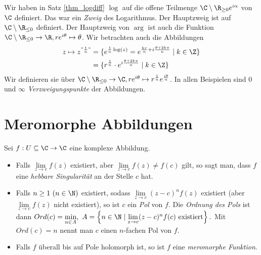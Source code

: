 		\begin{rem*}
			Wir haben in Satz \ref{thm_logdiff} $\log$ auf die offene Teilmenge $ \C \setminus \R_{\geq 0} e^{i\alpha} $ von $\C$ definiert. Das war ein \emph{Zweig} des Logarithmus. Der Hauptzweig ist auf $\C \setminus \R_{\leq 0}$ definiert. Der Hauptzweig von $\arg$ ist auch die Funktion $ \C \setminus \R_{\leq 0} \to \R, re^{i\theta} \mapsto \theta $. Wir betrachten auch die Abbildungen
			\begin{align*}
				z \mapsto z^{"\frac{1}{n}"} &= \{ e^{\frac{1}{n}\log(z)} = e^{\frac{hr}{n} + i \frac{\theta + 2k\pi}{n}} \mid k \in \Z \}\\
				&= \{ r^\frac{1}{n} \cdot e^{i \frac{\theta + 2k\pi}{n}} \mid k \in \Z \}
			\end{align*}
			Wir definieren sie über $ \C \setminus \R_{\leq 0} \to \C, re^{i\theta} \mapsto r^\frac{1}{n} e^\frac{i\theta}{n} $. In allen Beispielen sind 0 und $\infty$ \emph{Verzweigungspunkte} der Abbildungen.
		\end{rem*}
	
	
	\section{Meromorphe Abbildungen}
		
		\begin{defn}
			Sei $ f : U \subseteq \C \to \C $ eine komplexe Abbildung.
			\begin{itemize}
				\item Falls $ \lim\limits_{z \to c} f(z) $ existiert, aber $ \lim\limits_{z \to c} f(z) \neq f(c) $ gilt, so sagt man, dass $f$ eine \emph{hebbare Singularität} an der Stelle $c$ hat. 
				\item Falls $ n \geq 1\ (n \in \N) $ existiert, sodass $ \lim\limits_{z \to c} (z-c)^n f(z) $ existiert (aber $ \lim\limits_{z \to c} f(z) $ nicht existiert), so ist $c$ ein \emph{Pol} von $f$. Die \emph{Ordnung des Pols} ist dann $ Ord(c) = \min\limits_{n \in A},\ A = \left\{ n \in \N \mid \lim\limits_{z \to c}(z-c)^nf(c)\ \text{existiert} \right\}. $ Mit $ Ord(c) = n $ nennt man $c$ einen $n$-fachen Pol von $f$.
				\item Falls $ f $ überall bis auf Pole holomorph ist, so ist $f$ eine \emph{meromorphe Funktion}.
			\end{itemize}
		\end{defn}
